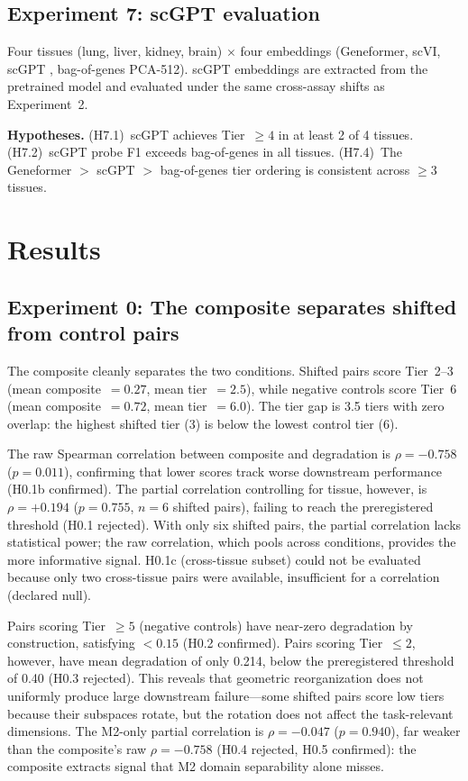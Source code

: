 \documentclass[11pt,letterpaper]{article}
\begin{document}
\subsection{Experiment 7: scGPT evaluation}

Four tissues (lung, liver, kidney, brain) $\times$ four embeddings (Geneformer, scVI, scGPT \citep{cui2024scgpt}, bag-of-genes PCA-512). scGPT embeddings are extracted from the pretrained model and evaluated under the same cross-assay shifts as Experiment~2.

\textbf{Hypotheses.} (H7.1)~scGPT achieves Tier~$\geq 4$ in at least 2 of 4 tissues. (H7.2)~scGPT probe F1 exceeds bag-of-genes in all tissues. (H7.4)~The Geneformer $>$ scGPT $>$ bag-of-genes tier ordering is consistent across $\geq 3$ tissues.


\section{Results}
\label{sec:results}

\subsection{Experiment 0: The composite separates shifted from control pairs}

The composite cleanly separates the two conditions. Shifted pairs score Tier~2--3 (mean composite~$= 0.27$, mean tier~$= 2.5$), while negative controls score Tier~6 (mean composite~$= 0.72$, mean tier~$= 6.0$). The tier gap is 3.5 tiers with zero overlap: the highest shifted tier (3) is below the lowest control tier (6).

The raw Spearman correlation between composite and degradation is $\rho = -0.758$ ($p = 0.011$), confirming that lower scores track worse downstream performance (H0.1b confirmed). The partial correlation controlling for tissue, however, is $\rho = +0.194$ ($p = 0.755$, $n = 6$ shifted pairs), failing to reach the preregistered threshold (H0.1 rejected). With only six shifted pairs, the partial correlation lacks statistical power; the raw correlation, which pools across conditions, provides the more informative signal. H0.1c (cross-tissue subset) could not be evaluated because only two cross-tissue pairs were available, insufficient for a correlation (declared null).

Pairs scoring Tier~$\geq 5$ (negative controls) have near-zero degradation by construction, satisfying $< 0.15$ (H0.2 confirmed). Pairs scoring Tier~$\leq 2$, however, have mean degradation of only 0.214, below the preregistered threshold of 0.40 (H0.3 rejected). This reveals that geometric reorganization does not uniformly produce large downstream failure---some shifted pairs score low tiers because their subspaces rotate, but the rotation does not affect the task-relevant dimensions. The M2-only partial correlation is $\rho = -0.047$ ($p = 0.940$), far weaker than the composite's raw $\rho = -0.758$ (H0.4 rejected, H0.5 confirmed): the composite extracts signal that M2 domain separability alone misses.
\end{document}
